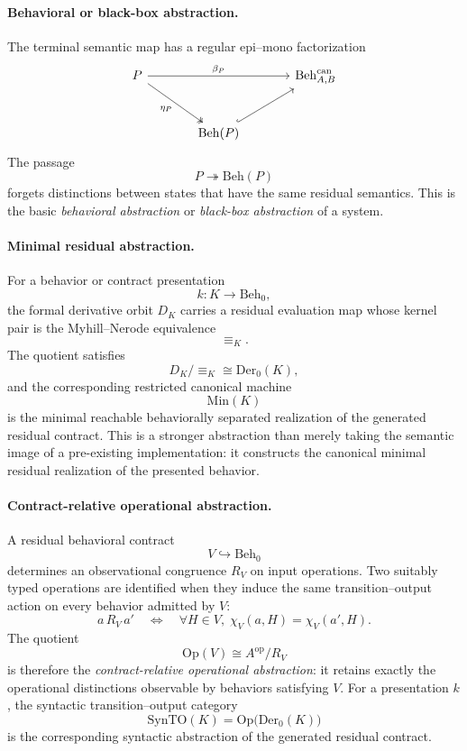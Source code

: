 \paragraph{Behavioral or black-box abstraction.}
The terminal semantic map has a regular epi--mono factorization
\[
\begin{tikzcd}[column sep=large,row sep=large]
  P
    \ar[rr,"\beta_P"]
    \ar[dr,two heads,"\eta_P"']
  &&
  \mathrm{Beh}^{\mathrm{can}}_{A,B}
  \\
  &
  \mathrm{Beh}(P)
    \ar[ur,hook]
  &
\end{tikzcd}
\]
The passage
\[
  P\twoheadrightarrow\mathrm{Beh}(P)
\]
forgets distinctions between states that have the same residual semantics.
This is the basic \emph{behavioral abstraction} or \emph{black-box
abstraction} of a system.

\paragraph{Minimal residual abstraction.}
For a behavior or contract presentation
\[
  k:K\to\mathrm{Beh}_0,
\]
the formal derivative orbit \(D_K\) carries a residual evaluation map whose
kernel pair is the Myhill--Nerode equivalence
\[
  {\equiv_K}.
\]
The quotient satisfies
\[
  D_K/{\equiv_K}
  \cong
  \mathrm{Der}_0(K),
\]
and the corresponding restricted canonical machine
\[
  \mathrm{Min}(K)
\]
is the minimal reachable behaviorally separated realization of the generated
residual contract.  This is a stronger abstraction than merely taking the
semantic image of a pre-existing implementation: it constructs the canonical
minimal residual realization of the presented behavior.

\paragraph{Contract-relative operational abstraction.}
A residual behavioral contract
\[
  V\hookrightarrow\mathrm{Beh}_0
\]
determines an observational congruence \(R_V\) on input operations.  Two
suitably typed operations are identified when they induce the same
transition--output action on every behavior admitted by \(V\):
\[
  a\,R_V\,a'
  \quad\Longleftrightarrow\quad
  \forall H\in V,\;
  \chi_V(a,H)=\chi_V(a',H).
\]
The quotient
\[
  \mathrm{Op}(V)
  \cong
  A^{\mathrm{op}}/R_V
\]
is therefore the \emph{contract-relative operational abstraction}: it retains
exactly the operational distinctions observable by behaviors satisfying
\(V\).  For a presentation \(k\), the syntactic transition--output category
\[
  \mathrm{SynTO}(K)
  =
  \mathrm{Op}\bigl(\mathrm{Der}_0(K)\bigr)
\]
is the corresponding syntactic abstraction of the generated residual
contract.

